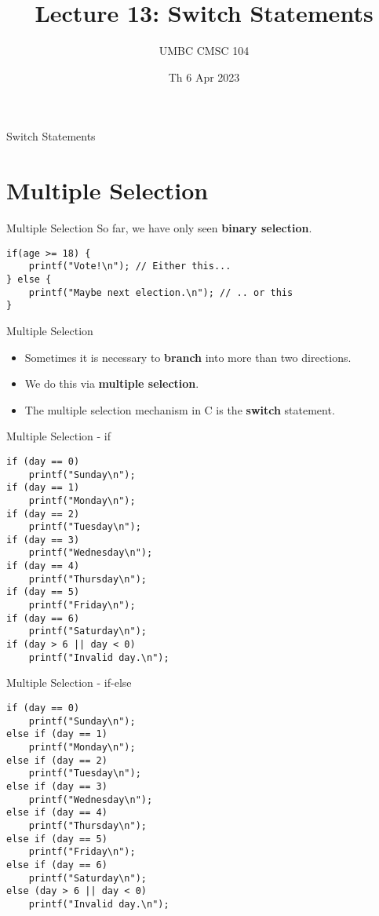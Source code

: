 \documentclass[graphics]{beamer}
\title{Lecture 13: Switch Statements}
\author{UMBC CMSC 104}
\date{Th 6 Apr 2023}
\begin{document}
\begin{frame}{}
\centering
    Switch Statements
\end{frame}

\frame{\tableofcontents}

\section{Multiple Selection}
\begin{frame}[fragile]{Multiple Selection}
    So far, we have only seen \textbf{binary selection}.
    \begin{verbatim}
if(age >= 18) {
    printf("Vote!\n"); // Either this...
} else {
    printf("Maybe next election.\n"); // .. or this
}
    \end{verbatim}
\end{frame}

\begin{frame}{Multiple Selection}
    \begin{itemize}
        \item Sometimes it is necessary to \textbf{branch} into more than two directions.
        \item We do this via \textbf{multiple selection}.
        \item The multiple selection mechanism in C is the \textbf{switch} statement.
    \end{itemize}
\end{frame}

\begin{frame}[fragile]{Multiple Selection - if}
    \begin{verbatim}
if (day == 0)
    printf("Sunday\n");
if (day == 1)
    printf("Monday\n");
if (day == 2)
    printf("Tuesday\n");
if (day == 3)
    printf("Wednesday\n");
if (day == 4)
    printf("Thursday\n");
if (day == 5)
    printf("Friday\n");
if (day == 6)
    printf("Saturday\n");
if (day > 6 || day < 0)
    printf("Invalid day.\n");
    \end{verbatim}
\end{frame}

\begin{frame}[fragile]{Multiple Selection - if-else}
    \begin{verbatim}
if (day == 0)
    printf("Sunday\n");
else if (day == 1)
    printf("Monday\n");
else if (day == 2)
    printf("Tuesday\n");
else if (day == 3)
    printf("Wednesday\n");
else if (day == 4)
    printf("Thursday\n");
else if (day == 5)
    printf("Friday\n");
else if (day == 6)
    printf("Saturday\n");
else (day > 6 || day < 0)
    printf("Invalid day.\n");
    \end{verbatim}
\end{frame}
\end{document}
